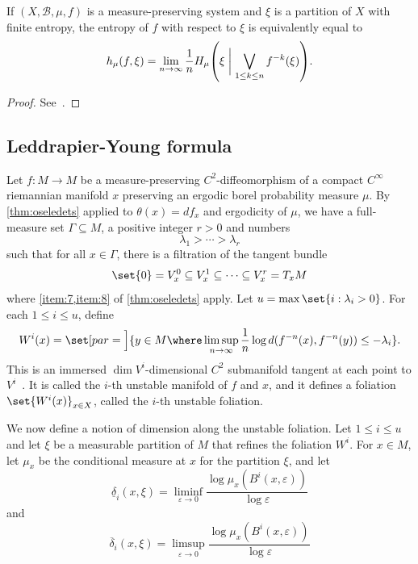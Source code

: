 \documentclass[../main]{subfiles}
\begin{document}
\begin{proposition}
  If \((X,\mathcal{B},\mu,f)\) is a measure-preserving system and \(\xi\) is a partition of \(X\) with finite entropy, the entropy of \(f\) with respect to \(\xi\) is equivalently equal to
  \begin{equation*}
    h_{\mu}(f,\xi) =
    \lim_{n \to \infty} \frac{1}{n}H_{\mu}\rpar*{\xi \mathrel{\bigg|} \bigvee_{1 \le k \le n}f^{-k}(\xi)}.
  \end{equation*}
\end{proposition}

\begin{proof}
  See~\cite[proposition 1.16]{einsiedlerEntropyErgodicTheory}.
\end{proof}

\subsection{Leddrapier-Young formula}

Let \(f \colon M \to M\) be a measure-preserving \(C^2\)-diffeomorphism of a compact \(C^{\infty}\) riemannian manifold \(x\) preserving an ergodic borel probability measure \(\mu\). By \cref{thm:oseledets} applied to \(\theta(x) = df_x\) and ergodicity of \(\mu\), we have a full-measure set \(\Gamma \subseteq M\), a positive integer \(r > 0\) and numbers \[\lambda_1 > \cdots > \lambda_r\] such that for all \(x \in \Gamma\), there is a filtration of the tangent bundle
\begin{equation*}
  \set{0} = V^0_x \subseteq V^1_x \subseteq \cdots \subseteq V^{r}_x = T_xM
\end{equation*}
where \cref{item:7,item:8} of \cref{thm:oseledets} apply. Let \(u = \max \set{i : \lambda_{i} > 0}\). For each \(1 \le i \le u\), define
\begin{equation*}
  W^i(x) = \set[par = \Big]{y \in M \where \limsup_{n \to \infty} \frac{1}{n} \log d(f^{-n}(x), f^{-n}(y))\le - \lambda_i }.
\end{equation*}
This is an immersed \(\dim V^i\)-dimensional \(C^2\) submanifold tangent at each point to \(V^i\)~\cite{ledrappierMetricEntropyDiffeomorphisms1985a}. It is called the \(i\)-th unstable manifold of \(f\) and \(x\), and it defines a foliation \(\set{W^i(x)}_{x \in X}\), called the \(i\)-th unstable foliation.

We now define a notion of dimension along the unstable foliation. Let \(1 \le i \le u\) and let \(\xi\) be a measurable partition of \(M\) that refines the foliation \(W^i\). For \(x \in M\), let \(\mu_x\) be the conditional measure at \(x\) for the partition \(\xi\), and let
\begin{equation*}
  \underline{\delta}_i(x,\xi) = \liminf_{\varepsilon \to 0}\frac{\log \mu_x (B^i(x,\varepsilon))}{\log \varepsilon}
\end{equation*}
and
\begin{equation*}
  \overline{\delta}_i(x,\xi) = \limsup_{\varepsilon \to 0}\frac{\log \mu_x (B^i(x,\varepsilon))}{\log \varepsilon}
\end{equation*}
\end{document}
